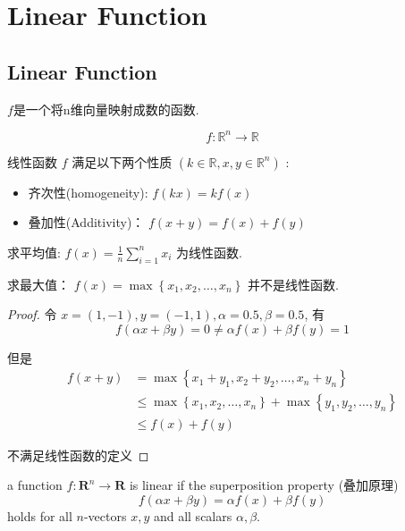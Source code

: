 \chapter{Linear Function}

\section{Linear Function}

\begin{definition}
    $f$是一个将n维向量映射成数的函数. 

    $$ f: \mathbb{R}^{n} \rightarrow \mathbb{R} $$

    线性函数 $ f $ 满足以下两个性质 $ \left(k \in \mathbb{R}, x, y \in \mathbb{R}^{n}\right) $ :

    \begin{itemize}
        \item 齐次性(homogeneity): $ f(k x)=k f(x) $
        \item 叠加性(Additivity)： $ f(x+y)=f(x)+f(y) $
    \end{itemize}
\end{definition}

\begin{example}
    求平均值: $ f(x)=\frac{1}{n} \sum_{i=1}^{n} x_{i} $ 为线性函数. 
\end{example}

\begin{example}
    求最大值： $ f(x)=\max \left\{x_{1}, x_{2}, \ldots, x_{n}\right\} $ 并不是线性函数. 
\end{example}

\begin{proof}
   令 $ x=(1,-1), y=(-1,1), \alpha=0.5, \beta=0.5 $, 
   有 $$ f(\alpha x+\beta y)=0 \neq \alpha f(x)+\beta f(y)=1 $$

    但是
   $$ \begin{aligned} f(x+y) 
    &=\max \left\{x_{1}+y_{1}, x_{2}+y_{2}, \ldots, x_{n}+y_{n}\right\} 
    \\ & \leq \max \left\{x_{1}, x_{2}, \ldots, x_{n}\right\}+\max \left\{y_{1}, y_{2}, \ldots, y_{n}\right\} 
    \\ & \leq f(x)+f(y) \end{aligned} $$

    不满足线性函数的定义
\end{proof}

\begin{theorem}
        a function $ f: \mathbf{R}^{n} \rightarrow \mathbf{R} $ is linear if the superposition property (叠加原理)
    $$
    f(\alpha x+\beta y)=\alpha f(x)+\beta f(y)
    $$
    holds for all $ n $-vectors $ x, y $ and all scalars $ \alpha, \beta $.
    
\end{theorem}

